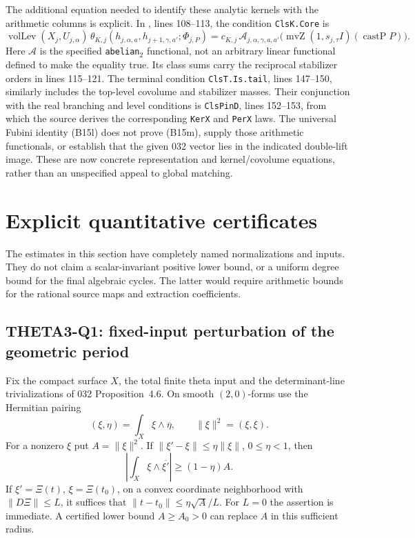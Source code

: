 \documentclass[11pt]{article}
\theoremstyle{definition}\newtheorem{definition}[theorem]{Definition}\newtheorem{remark}[theorem]{Remark}
\begin{document}
The additional equation needed to identify these analytic kernels with the arithmetic columns is explicit. In , lines 108--113, the condition \texttt{ClsK.Core} is
\[
 \operatorname{volLev}(X_j,U_{j,\alpha})\,
 \theta_{K,j}(h_{j,\alpha,a},h_{j+1,\gamma,a'};\Phi_{j,P})
 =c_{K,j}\,\mathcal A_{j,\alpha,\gamma,a,a'}
       \bigl(\operatorname{mvZ}(1,s_{j,\tau}I)(\operatorname{castP}P)\bigr).
 \tag{B15m}
\]
Here $\mathcal A$ is the specified \texttt{abelian\ensuremath{_2}} functional, not an arbitrary linear functional defined to make the equality true. Its class sums carry the reciprocal stabilizer orders in lines 115--121. The terminal condition \texttt{ClsT.Is.tail}, lines 147--150, similarly includes the top-level covolume and stabilizer masses. Their conjunction with the real branching and level conditions is \texttt{ClsPinD}, lines 152--153, from which the source derives the corresponding \texttt{KerX} and \texttt{PerX} laws. The universal Fubini identity (B15l) does not prove (B15m), supply those arithmetic functionals, or establish that the given 032 vector lies in the indicated double-lift image. These are now concrete representation and kernel/covolume equations, rather than an unspecified appeal to global matching.


\section{Explicit quantitative certificates}
\label{sec:quantitative}
The estimates in this section have completely named normalizations and inputs. They do not claim a scalar-invariant positive lower bound, or a uniform degree bound for the final algebraic cycles. The latter would require arithmetic bounds for the rational source maps and extraction coefficients.

\subsection{THETA3-Q1: fixed-input perturbation of the geometric period}\label{Q1}
Fix the compact surface $X$, the total finite theta input and the determinant-line trivializations of 032 Proposition~4.6. On smooth $(2,0)$-forms use the Hermitian pairing
\[
 (\xi,\eta)=\int_X\xi\wedge\overline\eta,
 \qquad \|\xi\|^2=(\xi,\xi).
\]
For a nonzero $\xi$ put $A=\|\xi\|^2$. If
$\|\xi'-\xi\|\leq\eta\|\xi\|$, $0\leq\eta<1$, then
\begin{equation}\label{eq:perturb}
 \left|\int_X\xi\wedge\overline{\xi'}\right|
 \geq (1-\eta)A.
\end{equation}
If $\xi'=\Xi(t)$, $\xi=\Xi(t_0)$, on a convex coordinate neighborhood with $\|D\Xi\|\leq L$, it suffices that
$\|t-t_0\|\leq\eta\sqrt A/L$. For $L=0$ the assertion is immediate. A certified lower bound $A\geq A_0>0$ can replace $A$ in this sufficient radius.
\end{document}
